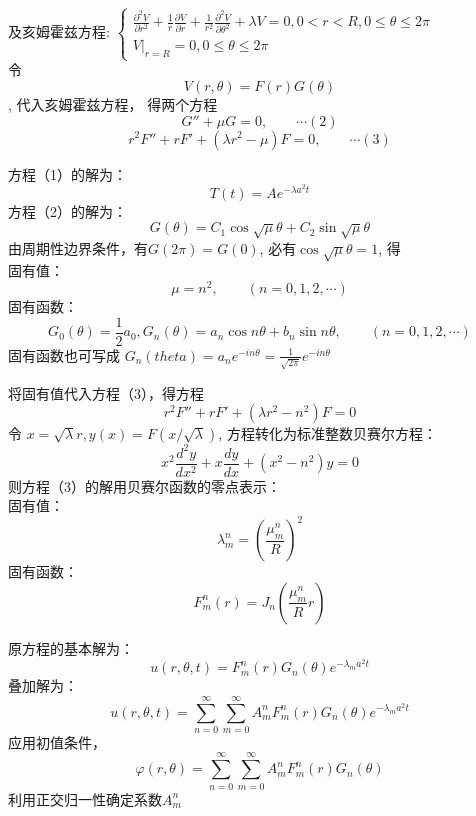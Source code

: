 \begin{frame}
	及亥姆霍兹方程:
	$\left\{
	\begin{array}{l}
		\frac{\partial^{2} V}{\partial r^{2}}+\frac{1}{r} \frac{\partial V}{\partial r}+\frac{1}{r^{2}} 
		\frac{\partial^{2} V}{\partial \theta^{2}}+\lambda V=0, 0<r<R, 
		0 \leq \theta \leq 2 \pi \\
		\left.V\right|_{r=R}=0, 0 \leq \theta \leq 2 \pi
		\end{array}
	\right.$\\
	令\[V(r, \theta) =F(r)G(\theta)\], 代入亥姆霍兹方程， 得两个方程\\
	\[G''+\mu G=0, \qquad \cdots (2) \]
	\[r^2 F''+r F' +(\lambda r^2 -\mu )F=0, \qquad \cdots (3) \]
\end{frame}	

\begin{frame}
	方程（1）的解为：\[T(t)=Ae^{-\lambda a^2 t}\]
	方程（2）的解为：\[G(\theta)=C_1\cos\sqrt{\mu}\theta + C_2\sin \sqrt{\mu}\theta \]
	由周期性边界条件，有$G(2\pi)=G(0)$, 必有$\cos \sqrt{\mu}\theta =1 $, 得\\
	固有值：
	\[\mu = n^2, \qquad (n=0,1,2,\cdots)\]
	固有函数：
	\[G_0(\theta)=\frac{1}{2}a_0, G_n(\theta)= a_n\cos n \theta + b_n \sin n \theta, \qquad (n=0,1,2,\cdots)\]
	固有函数也可写成 $ G_n(theta)=a_n e^{-i n \theta} =\frac{1}{\sqrt{2\pi}} e^{-i n \theta}$
\end{frame}	

\begin{frame}
	将固有值代入方程（3），得方程 
	\[r^2 F''+r F' +(\lambda r^2 -n^2 )F=0 \]
	令 $x=\sqrt{\lambda} r, y(x)=F(x/\sqrt{\lambda})$, 
	方程转化为标准整数贝赛尔方程：
	\begin{equation*}
		x^2\frac{d^2y}{dx^2} + x\frac{dy}{dx} +(x^2 -n^2)y=0
	\end{equation*}
	则方程（3）的解用贝赛尔函数的零点表示：\\
	固有值：
	\[\lambda_m ^n =(\frac{\mu_{m}^{n}}{R})^2 \]
	固有函数：\[F_m ^n(r) = J_n (\frac{\mu_{m}^{n}}{R}r) \]
\end{frame}	
\begin{frame}
	原方程的基本解为：
	\begin{equation*}
		u(r,\theta,t) =F_m ^n (r) G_n(\theta) e^{-\lambda_m a^2 t}
	\end{equation*}
	叠加解为：
	\begin{equation*}
		u(r,\theta,t) =\sum_{n=0}^{\infty} \sum_{m=0}^{\infty} A_m ^n F_m ^n (r) G_n(\theta) e^{-\lambda_m a^2 t}
	\end{equation*}
	应用初值条件， 
	\begin{equation*}
		\varphi(r, \theta)=\sum_{n=0}^{\infty} \sum_{m=0}^{\infty} A_m ^n F_m ^n (r) G_n(\theta) 
	\end{equation*}
	利用正交归一性确定系数$A_m ^n$
\end{frame}	

